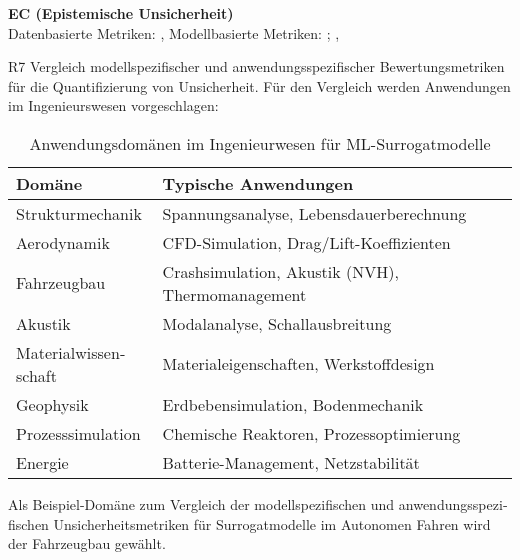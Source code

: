 \begin{otherlanguage}{ngerman}
{\begin{minipage}[t]{\textwidth}
\textbf{EC (Epistemische Unsicherheit)}\\
\quad Datenbasierte Metriken: \parencite[S.~30–32]{bishop2006pattern}, 
\quad Modellbasierte Metriken: \parencite[S.~40–42]{gal2016uncertainty}; \parencite{sensoy2018evidential}, 
\end{minipage}%
}


\pagebreak


R7 Vergleich modellspezifischer und anwendungsspezifischer Bewertungsmetriken für die Quantifizierung von Unsicherheit.
\newline
Für den Vergleich werden Anwendungen im Ingenieurswesen vorgeschlagen: 

\begin{table}[!htbp]
\centering
\scriptsize
\begin{tabularx}{\textwidth}{|l|X|}
\hline
\textbf{Domäne} & \textbf{Typische Anwendungen} \\
\hline
Strukturmechanik & Spannungsanalyse, Lebensdauerberechnung \\
\hline
Aerodynamik & CFD-Simulation, Drag/Lift-Koeffizienten \\
\hline
Fahrzeugbau & Crashsimulation, Akustik (NVH), Thermomanagement \\
\hline
Akustik & Modalanalyse, Schallausbreitung \\
\hline
Materialwissenschaft & Materialeigenschaften, Werkstoffdesign \\
\hline
Geophysik & Erdbebensimulation, Bodenmechanik \\
\hline
Prozesssimulation & Chemische Reaktoren, Prozessoptimierung \\
\hline
Energie & Batterie-Management, Netzstabilität \\
\hline
\end{tabularx}
\caption{Anwendungsdomänen im Ingenieurwesen für ML-Surrogatmodelle}
\label{tab:ingenieurwesen-domains-small}
\end{table}

Als Beispiel-Domäne zum Vergleich der modellspezifischen und anwendungsspezifischen Unsicherheitsmetriken für Surrogatmodelle im Autonomen Fahren wird der Fahrzeugbau gewählt. 


\end{otherlanguage}
